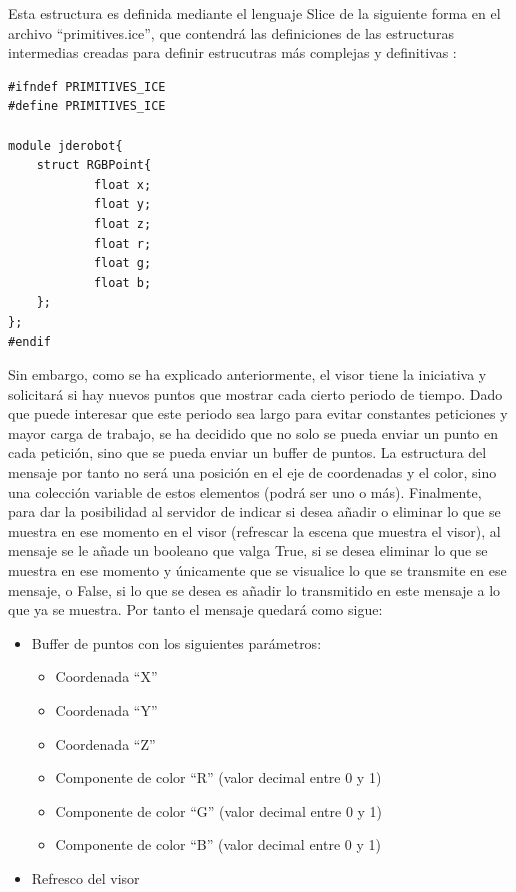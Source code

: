 Esta estructura es definida mediante el lenguaje Slice de la siguiente forma en el archivo ``primitives.ice'', que contendrá las definiciones de las estructuras intermedias creadas para definir estrucutras más complejas y definitivas :

\begin{lstlisting}[frame=single]
#ifndef PRIMITIVES_ICE
#define PRIMITIVES_ICE

module jderobot{
	struct RGBPoint{
      		float x;
      		float y;
      		float z;
      		float r;
      		float g;
      		float b;
	};
};
#endif
\end{lstlisting}

Sin embargo, como se ha explicado anteriormente, el visor tiene la iniciativa y solicitará si hay nuevos puntos que mostrar cada cierto periodo de tiempo. Dado que puede interesar que este periodo sea largo para evitar constantes peticiones y mayor carga de trabajo, se ha decidido que no solo se pueda enviar un punto en cada petición, sino que se pueda enviar un buffer de puntos. La estructura del mensaje por tanto no será una posición en el eje de coordenadas y el color, sino una colección variable de estos elementos (podrá ser uno o más).
Finalmente, para dar la posibilidad al servidor de indicar si desea añadir o eliminar lo que se muestra en ese momento en el visor (refrescar la escena que muestra el visor), al mensaje se le añade un booleano que valga True, si se desea eliminar lo que se muestra en ese momento y únicamente que se visualice lo que se transmite en ese mensaje, o False, si lo que se desea es añadir lo transmitido en este mensaje a lo que ya se muestra.
Por tanto el mensaje quedará como sigue:
\begin{itemize}
\item Buffer de puntos con los siguientes parámetros:
	\begin{itemize}
	\item Coordenada ``X''
	\item Coordenada ``Y''
	\item Coordenada ``Z''
	\item Componente de color ``R'' (valor decimal entre 0 y 1)
	\item Componente de color ``G'' (valor decimal entre 0 y 1)
	\item Componente de color ``B'' (valor decimal entre 0 y 1)
	\end{itemize}
\item Refresco del visor
\end{itemize}

